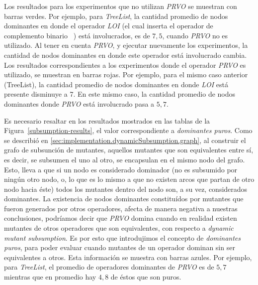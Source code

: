 Los resultados para los experimentos que no utilizan \emph{PRVO} se muestran con barras verdes. Por ejemplo, para \emph{TreeList}, la cantidad promedio de nodos dominantes en donde el operador \emph{LOI} (el cual inserta el operador de complemento binario \emph{~}) est\'a involucrados, es de $7,5$, cuando \emph{PRVO} no es utilizado. Al tener en cuenta \emph{PRVO}, y ejecutar nuevamente los experimentos, la cantidad de nodos dominantes en donde este operador est\'a involucrado cambia. Los resultados correspondientes a los experimentos donde el operador \emph{PRVO} es utilizado, se muestran en barras rojas. Por ejemplo, para el mismo caso anterior (TreeList), la cantidad promedio de nodos dominantes en donde \emph{LOI} est\'a presente disminuye a 7. En este mismo caso, la cantidad promedio de nodos dominantes donde \emph{PRVO} est\'a involucrado pasa a $5,7$.

Es necesario resaltar en los resultados mostrados en las tablas de la Figura~\ref{subsumption-results}, el valor correspondiente a \emph{dominantes puros}. Como se describi\'o en \ref{sec:implementation.dynamicSubsumption.graph}, al construir el grafo de subsunci\'on de mutantes, aquellos mutantes que son equivalentes entre s\'i, es decir, se subsumen el uno al otro, se encapsulan en el mismo nodo del grafo. Esto, lleva a que si un nodo es considerado dominador (no es subsumido por ning\'un otro nodo, o, lo que es lo mismo a que no existen arcos que partan de otro nodo hacia \'este) todos los mutantes dentro del nodo son, a su vez, considerados dominantes. La existencia de nodos dominantes constitu\'idos por mutantes que fueron generados por otros operadores, afecta de manera negativa a nuestras conclusiones, podr\'iamos decir que \emph{PRVO} domina cuando en realidad existen mutantes de otros operadores que son equivalentes, con respecto a \emph{dynamic mutant subsumption}. Es por esto que introdujimos el concepto de \emph{dominantes puros}, para poder evaluar cuando mutantes de un operador dominan sin ser equivalentes a otros. Esta informaci\'on se muestra con barras azules. Por ejemplo, para \emph{TreeList}, el promedio de operadores dominantes de \emph{PRVO} es de $5,7$ mientras que en promedio hay $4,8$ de \'estos que son puros.

